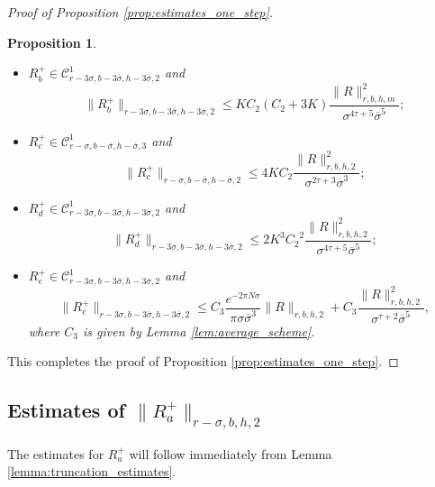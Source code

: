 \documentclass[10pt]{article}
\newtheorem{proposition}[theorem]{Proposition}
\begin{document}
\begin{proof}[Proof of Proposition \ref{prop:estimates_one_step}]
\begin{proposition}
\begin{itemize}
        \item[b.] $R_b^+\in\mathscr C^1_{r-3\sigma,b-3\overline\sigma,h-3\overline\sigma,2}$ and
        \[
         \|R_b^+\|_{r-3\sigma,b-3\overline\sigma,h-3\overline\sigma,2}
         \leq KC_2(C_2+3K)
         \frac{\|R\|_{r,b,h,m}^2}{\sigma^{4\tau+5}\overline\sigma^5};
        \]
        
        \item[c.] $R_c^+\in\mathscr C^1_{r-\sigma,b-\overline\sigma,h-\overline\sigma,3}$ and
        \[
        \|R_c^+\|_{r-\sigma,b-\overline\sigma,h-\overline\sigma,2} 
        \leq
        4KC_2
        \frac{\|R\|_{r,b,h,2}^2}{\sigma^{2\tau+3}\overline\sigma^3};
        \]
        
        \item[d.] $R_d^+\in\mathscr C^1_{r-3\sigma,b-3\overline\sigma,h-3\overline\sigma,2}$ and
        \[
        \|R_d^+\|_{r-3\sigma,b-3\overline\sigma,h-3\overline\sigma,2} 
        \leq 
        2K^3{C_2}^2
        \frac{\|R\|_{r,b,h,2}^2}{\sigma^{4\tau+5}\overline\sigma^5};
        \]
        \item[e.] $R_e^+\in\mathscr C^1_{r - 3\sigma, b - 3 \overline \sigma, h - 3 \overline \sigma, 2}$ and
        \[
        \|R_e^+\|_{r - 3\sigma, b - 3 \overline \sigma, h - 3 \overline \sigma, 2} 
        \leq 
        C_3\frac{e^{-2\pi N \sigma}}{\pi \sigma \overline \sigma^3}\| R \|_{r,b,h,2} + C_3\frac{\| R \|_{r,b,h,2}^2}{\sigma^{\tau + 2} \overline \sigma^5},
        \]
        where $C_3$ is given by Lemma \ref{lem:average_scheme}.
    \end{itemize}
\end{proposition}
This completes the proof of Proposition \ref{prop:estimates_one_step}.
\end{proof}

\subsection{Estimates of $\|R_a^+\|_{r-\sigma,b,h,2}$}
The estimates for $R_a^+$ will follow immediately from Lemma \ref{lemma:truncation_estimates}.
\end{document}
